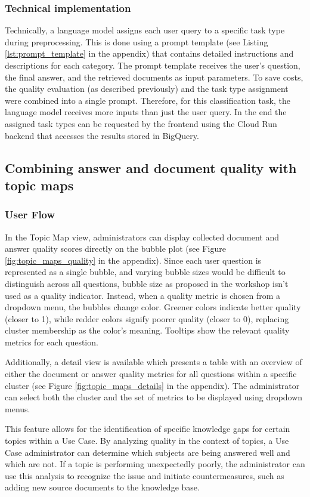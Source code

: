 \documentclass[
	english,
	ruledheaders=section,%
	class=report,%
	thesis={type=bachelor},%
	accentcolor=1b,%
	custommargins=true,%
	marginpar=false,%
	parskip=half-,%
	fontsize=11pt,%
	DIV=14,
]{tudapub}
\begin{document}
\subsubsection{Technical implementation}
Technically, a language model assigns each user query to a specific task type during preprocessing. This is done using a prompt template (see Listing \ref{lst:prompt_template} in the appendix) that contains detailed instructions and descriptions for each category. The prompt template receives the user's question, the final answer, and the retrieved documents as input parameters. To save costs, the quality evaluation (as described previously) and the task type assignment were combined into a single prompt. Therefore, for this classification task, the language model receives more inputs than just the user query. In the end the assigned task types can be requested by the frontend using the Cloud Run backend that accesses the results stored in BigQuery.
\subsection{Combining answer and document quality with topic maps}
\subsubsection{User Flow}
In the Topic Map view, administrators can display collected document and answer quality scores directly on the bubble plot (see Figure \ref{fig:topic_maps_quality} in the appendix). Since each user question is represented as a single bubble, and varying bubble sizes would be difficult to distinguish across all questions, bubble size as proposed in the workshop isn't used as a quality indicator. Instead, when a quality metric is chosen from a dropdown menu, the bubbles change color. Greener colors indicate better quality (closer to 1), while redder colors signify poorer quality (closer to 0), replacing cluster membership as the color's meaning. Tooltips show the relevant quality metrics for each question.

Additionally, a detail view is available which presents a table with an overview of either the document or answer quality metrics for all questions within a specific cluster (see Figure  \ref{fig:topic_maps_details} in the appendix). The administrator can select both the cluster and the set of metrics to be displayed using dropdown menus.

This feature allows for the identification of specific knowledge gaps for certain topics within a Use Case. By analyzing quality in the context of topics, a Use Case administrator can determine which subjects are being answered well and which are not. If a topic is performing unexpectedly poorly, the administrator can use this analysis to recognize the issue and initiate countermeasures, such as adding new source documents to the knowledge base.
\end{document}
